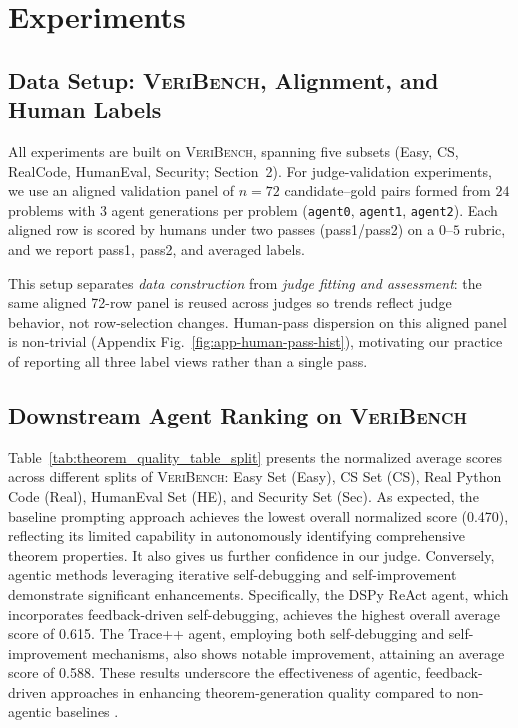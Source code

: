 \documentclass{article}
\begin{document}
\section{Experiments}
\subsection{Data Setup: \textsc{VeriBench}, Alignment, and Human Labels}
All experiments are built on \textsc{VeriBench}, spanning five subsets (Easy, CS, RealCode, HumanEval, Security; Section~2).
For judge-validation experiments, we use an aligned validation panel of \(n=72\) candidate--gold pairs formed from \(24\) problems with \(3\) agent generations per problem (\texttt{agent0}, \texttt{agent1}, \texttt{agent2}).
Each aligned row is scored by humans under two passes (pass1/pass2) on a \(0\)--\(5\) rubric, and we report pass1, pass2, and averaged labels.

This setup separates \emph{data construction} from \emph{judge fitting and assessment}: the same aligned 72-row panel is reused across judges so trends reflect judge behavior, not row-selection changes.
Human-pass dispersion on this aligned panel is non-trivial (Appendix Fig.~\ref{fig:app-human-pass-hist}), motivating our practice of reporting all three label views rather than a single pass.

\subsection{Downstream Agent Ranking on \textsc{VeriBench}}
Table~\ref{tab:theorem_quality_table_split} presents the normalized average scores across different splits of \textsc{VeriBench}: Easy Set (Easy), CS Set (CS), Real Python Code (Real), HumanEval Set (HE), and Security Set (Sec).
As expected, the baseline prompting approach achieves the lowest overall normalized score (0.470), reflecting its limited capability in autonomously identifying comprehensive theorem properties.
It also gives us further confidence in our judge.
Conversely, agentic methods leveraging iterative self-debugging and self-improvement demonstrate significant enhancements.
Specifically, the DSPy ReAct agent, which incorporates feedback-driven self-debugging, achieves the highest overall average score of 0.615.
The Trace++ agent, employing both self-debugging and self-improvement mechanisms, also shows notable improvement, attaining an average score of 0.588.
These results underscore the effectiveness of agentic, feedback-driven approaches in enhancing theorem-generation quality compared to non-agentic baselines \citep{khattab2024dspy,cheng2024trace,chen2021evaluating}.
\end{document}

